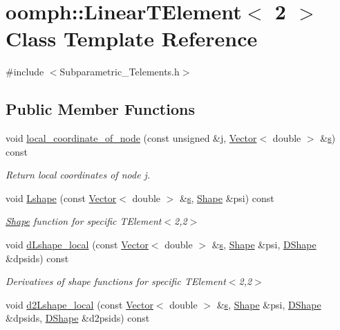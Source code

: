 \hypertarget{classoomph_1_1LinearTElement_3_012_01_4}{}\section{oomph\+:\+:Linear\+T\+Element$<$ 2 $>$ Class Template Reference}
\label{classoomph_1_1LinearTElement_3_012_01_4}


{\ttfamily \#include $<$Subparametric\+\_\+\+Telements.\+h$>$}

\subsection*{Public Member Functions}
\begin{DoxyCompactItemize}
\item 
void \hyperlink{classoomph_1_1LinearTElement_3_012_01_4_a0f45d00770d1c86cb2eb65d747b5cba3}{local\+\_\+coordinate\+\_\+of\+\_\+node} (const unsigned \&j, \hyperlink{classoomph_1_1Vector}{Vector}$<$ double $>$ \&\hyperlink{cfortran_8h_ab7123126e4885ef647dd9c6e3807a21c}{s}) const
\begin{DoxyCompactList}\small\item\em Return local coordinates of node j. \end{DoxyCompactList}\item 
void \hyperlink{classoomph_1_1LinearTElement_3_012_01_4_ab20729d302959a5d81e0dfa8b3f4b9e5}{Lshape} (const \hyperlink{classoomph_1_1Vector}{Vector}$<$ double $>$ \&\hyperlink{cfortran_8h_ab7123126e4885ef647dd9c6e3807a21c}{s}, \hyperlink{classoomph_1_1Shape}{Shape} \&psi) const
\begin{DoxyCompactList}\small\item\em \hyperlink{classoomph_1_1Shape}{Shape} function for specific T\+Element$<$2,2$>$ \end{DoxyCompactList}\item 
void \hyperlink{classoomph_1_1LinearTElement_3_012_01_4_a25953f47a9f66aaa947cba3c667f0ef2}{d\+Lshape\+\_\+local} (const \hyperlink{classoomph_1_1Vector}{Vector}$<$ double $>$ \&\hyperlink{cfortran_8h_ab7123126e4885ef647dd9c6e3807a21c}{s}, \hyperlink{classoomph_1_1Shape}{Shape} \&psi, \hyperlink{classoomph_1_1DShape}{D\+Shape} \&dpsids) const
\begin{DoxyCompactList}\small\item\em Derivatives of shape functions for specific T\+Element$<$2,2$>$ \end{DoxyCompactList}\item 
void \hyperlink{classoomph_1_1LinearTElement_3_012_01_4_a0deccf130233fc497906f9b48608045e}{d2\+Lshape\+\_\+local} (const \hyperlink{classoomph_1_1Vector}{Vector}$<$ double $>$ \&\hyperlink{cfortran_8h_ab7123126e4885ef647dd9c6e3807a21c}{s}, \hyperlink{classoomph_1_1Shape}{Shape} \&psi, \hyperlink{classoomph_1_1DShape}{D\+Shape} \&dpsids, \hyperlink{classoomph_1_1DShape}{D\+Shape} \&d2psids) const
\end{DoxyCompactItemize}


